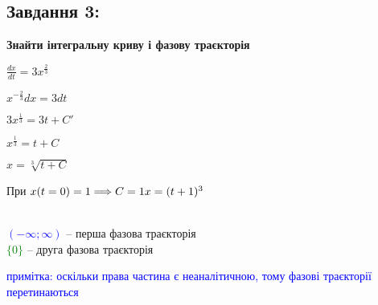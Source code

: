 \subsection{Завдання 3:}

\textbf{Знайти інтегральну криву і фазову траєкторія}

\begin{minipage}{0.49\textwidth}
    $\frac{dx}{dt} = 3x^{\frac{2}{3}}$

    $x^{-\frac{2}{3}}dx = 3dt$

    $3x^{\frac{1}{3}} = 3t + C'$

    $x^{\frac{1}{3}} = t + C$

    $x = \sqrt[3]{t +C}$

    При $x(t = 0) = 1 \Longrightarrow C = 1\\
    x = (t + 1)^3$

\end{minipage}
\begin{minipage}{0.49\textwidth}
    \centering \resizebox*{7cm}{7cm}{}\\
    \textcolor{blue}{$(-\infty;\infty)$} -- перша фазова траєкторія\\
    \textcolor{green}{$\{0\}$} -- друга фазова траєкторія
\end{minipage}

\textcolor{blue}{примітка: оскільки права частина є неаналітичною, тому фазові траєкторії перетинаються}
